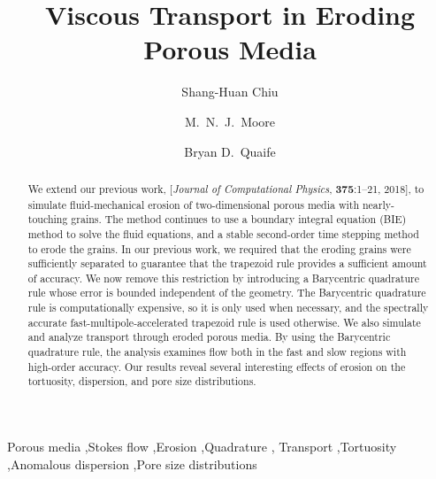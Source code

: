 \documentclass[preprint,10pt]{elsarticle}
\begin{document}
\title{Viscous Transport in Eroding Porous Media}



\author[SH]{Shang-Huan Chiu}
\author[Nick]{M.~N.~J.~Moore}
\author[Bryan]{Bryan D.~Quaife}

\address[SH]{Department of Scientific Computing, Florida State
University, Tallahassee, FL, 32306.}
\address[Nick]{Department of Mathematics and Geophysical Fluid Dynamics
Institute, Florida State University, Tallahassee, FL, 32306.}
\address[Bryan]{Department of Scientific Computing and Geophysical Fluid
Dynamics Institute, Florida State University, Tallahassee, FL, 32306.}

\begin{abstract} 
  We extend our previous work, [{\em Journal of Computational Physics},
  {\bf 375}:1--21, 2018], to simulate fluid-mechanical erosion of
  two-dimensional porous media with nearly-touching grains.  The method
  continues to use a boundary integral equation (BIE) method to solve
  the fluid equations, and a stable second-order time stepping method to
  erode the grains.  In our previous work, we required that the eroding
  grains were sufficiently separated to guarantee that the trapezoid
  rule provides a sufficient amount of accuracy. We now remove this
  restriction by introducing a Barycentric quadrature rule whose error
  is bounded independent of the geometry.  The Barycentric quadrature
  rule is computationally expensive, so it is only used when necessary,
  and the spectrally accurate fast-multipole-accelerated trapezoid rule
  is used otherwise. We also simulate and analyze transport through
  eroded porous media.  By using the Barycentric quadrature rule, the
  analysis examines flow both in the fast and slow regions with
  high-order accuracy. Our results reveal several interesting  effects
  of erosion on the tortuosity, dispersion, and pore size distributions.
\end{abstract}

\begin{keyword}
  Porous media \sep Stokes flow \sep Erosion \sep Quadrature \sep
  Transport \sep Tortuosity \sep Anomalous dispersion \sep Pore size
  distributions
\end{keyword}

\maketitle

\end{document}
